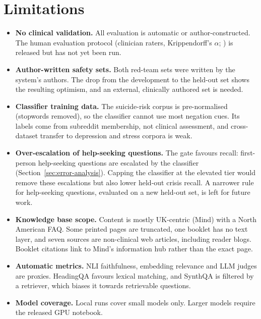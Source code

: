 \documentclass[preprint,12pt,authoryear]{elsarticle}
\newcommand{\todohuman}[1]{{\color{orange!80!black}\scriptsize\ttfamily [TODO(human): #1]}}
\begin{document}
\section{Limitations}\label{sec:limitations}
\begin{itemize}[leftmargin=*]
\item \textbf{No clinical validation.} All evaluation is automatic or author-constructed. The human evaluation protocol
      (clinician raters, Krippendorff's $\alpha$; \citealp{hayes2007krippendorff}) is released but has not yet been run.
      \todohuman{run eval/human\_eval}
\item \textbf{Author-written safety sets.} Both red-team sets were written by the system's authors. The drop from the
      development to the held-out set shows the resulting optimism, and an external, clinically authored set is needed.
\item \textbf{Classifier training data.} The suicide-risk corpus is pre-normalised (stopwords removed), so the classifier
      cannot use most negation cues. Its labels come from subreddit membership, not clinical assessment, and cross-dataset
      transfer to depression and stress corpora is weak.
\item \textbf{Over-escalation of help-seeking questions.} The gate favours recall: first-person help-seeking questions
      are escalated by the classifier (Section~\ref{sec:error-analysis}). Capping the classifier at the elevated tier
      would remove these escalations but also lower held-out crisis recall. A narrower rule for help-seeking questions,
      evaluated on a new held-out set, is left for future work.
\item \textbf{Knowledge base scope.} Content is mostly UK-centric (Mind) with a North American FAQ. Some printed pages are
      truncated, one booklet has no text layer, and seven sources are non-clinical web articles, including reader blogs.
      Booklet citations link to Mind's information hub rather than the exact page.
\item \textbf{Automatic metrics.} NLI faithfulness, embedding relevance and LLM judges are proxies. HeadingQA favours
      lexical matching, and SynthQA is filtered by a retriever, which biases it towards retrievable questions.
\item \textbf{Model coverage.} Local runs cover small models only. Larger models require the released GPU notebook.
\end{itemize}
\end{document}
